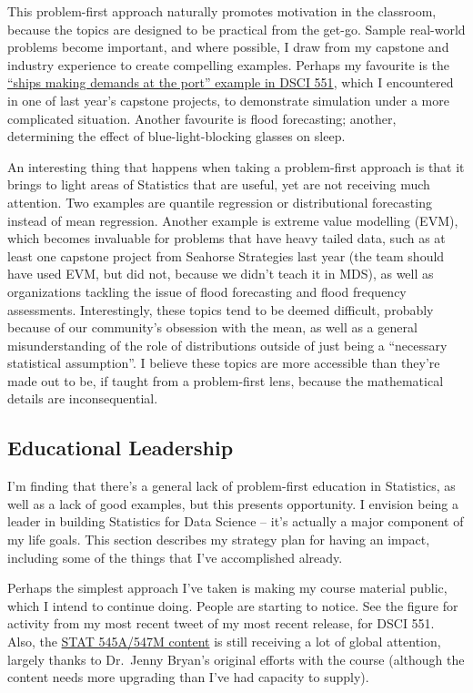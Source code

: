 \documentclass[]{article}
\begin{document}
This problem-first approach naturally promotes motivation in the classroom, because the topics are designed to be practical from the get-go. Sample real-world problems become important, and where possible, I draw from my capstone and industry experience to create compelling examples. Perhaps my favourite is the \href{https://ubc-mds.github.io/DSCI_551_stat-prob-dsci/lectures/simulation.html\#multi-step-simulations-10-min}{``ships making demands at the port'' example in DSCI 551}, which I encountered in one of last year's capstone projects, to demonstrate simulation under a more complicated situation. Another favourite is flood forecasting; another, determining the effect of blue-light-blocking glasses on sleep.

An interesting thing that happens when taking a problem-first approach is that it brings to light areas of Statistics that are useful, yet are not receiving much attention. Two examples are quantile regression or distributional forecasting instead of mean regression. Another example is extreme value modelling (EVM), which becomes invaluable for problems that have heavy tailed data, such as at least one capstone project from Seahorse Strategies last year (the team should have used EVM, but did not, because we didn't teach it in MDS), as well as organizations tackling the issue of flood forecasting and flood frequency assessments. Interestingly, these topics tend to be deemed difficult, probably because of our community's obsession with the mean, as well as a general misunderstanding of the role of distributions outside of just being a ``necessary statistical assumption''. I believe these topics are more accessible than they're made out to be, if taught from a problem-first lens, because the mathematical details are inconsequential.

\hypertarget{educational-leadership}{%
\subsection{Educational Leadership}\label{educational-leadership}}

I'm finding that there's a general lack of problem-first education in Statistics, as well as a lack of good examples, but this presents opportunity. I envision being a leader in building Statistics for Data Science -- it's actually a major component of my life goals. This section describes my strategy plan for having an impact, including some of the things that I've accomplished already.

Perhaps the simplest approach I've taken is making my course material public, which I intend to continue doing. People are starting to notice. See the figure for activity from my most recent tweet of my most recent release, for DSCI 551. Also, the \href{https://stat545guidebook.netlify.com/}{STAT 545A/547M content} is still receiving a lot of global attention, largely thanks to Dr.~Jenny Bryan's original efforts with the course (although the content needs more upgrading than I've had capacity to supply).
\end{document}
